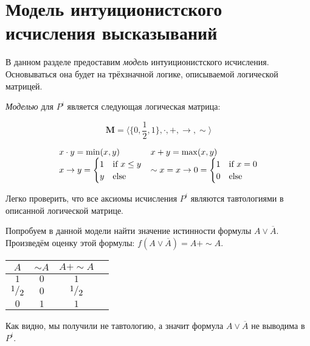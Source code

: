 \section{Модель интуиционистского исчисления высказываний}

В данном разделе предоставим \textit{модель} интуиционистского исчисления. Основываться она будет на трёхзначной логике, описываемой логической матрицей.

\begin{definition}
    \textit{Моделью} для $P^i$ является следующая логическая матрица:

    \begin{equation*}
        \mathbf{M} = 
        \langle
            \{0, \frac{1}{2}, 1\}, \cdot, +, \to, \sim
        \rangle
    \end{equation*}

    \begin{equation*}
        \begin{array}{ll}
            x \cdot y = \min(x,y) 
            &
            x + y = \max(x,y) 
            \\
            x \to y = \begin{cases}
                1 &\text{if}\ x \le y \\
                y &\text{else}
            \end{cases} 
            &
            \sim x = x \to 0 = \begin{cases}
                1 &\text{if}\ x = 0 \\ 
                0 &\text{else}
            \end{cases}
        \end{array}
        \\
    \end{equation*}
\end{definition}

\begin{remark}
    Легко проверить, что все аксиомы исчисления $P^i$ являются тавтологиями в описанной логической матрице.
\end{remark}

\begin{example}
    Попробуем в данной модели найти значение истинности формулы $A \lor \overline{A}$. Произведём оценку этой формулы: $f(A \lor \overline{A}) = A + \sim A$.

    \begin{tabular}{|c|c|c|c|}\hline
        $A$            & $\sim A$ & $A + \sim A$   \\\hline
        $1$            & $0$      & $1$            \\\hline
        $\sfrac{1}{2}$ & $0$      & $\sfrac{1}{2}$ \\\hline
        $0$            & $1$      & $1$            \\\hline
    \end{tabular}

    Как видно, мы получили не тавтологию, а значит формула $A \lor \overline{A}$ не выводима в $P^i$.
\end{example}


